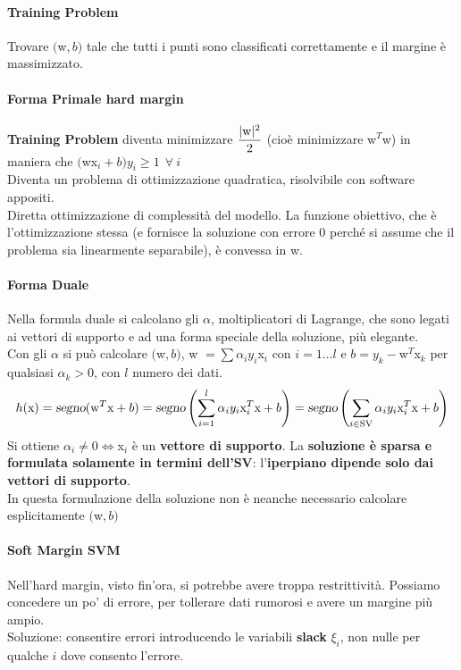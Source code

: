 \documentclass[10pt]{book}
\begin{document}
\paragraph{Training Problem} Trovare $($w$, b)$ tale che tutti i punti sono classificati correttamente e il margine è massimizzato.
\paragraph{Forma Primale hard margin} \textbf{Training Problem} diventa minimizzare $\mathlarger{\frac{|\text{w}|^2}{2}}$ (cioè minimizzare w$^T$w) in maniera che $($wx$_i + b)y_i \geq 1\:\:\forall\:i$\\
Diventa un problema di ottimizzazione quadratica, risolvibile con software appositi.\\
Diretta ottimizzazione di complessità del modello. La funzione obiettivo, che è l'ottimizzazione stessa (e fornisce la soluzione con errore 0 perché si assume che il problema sia linearmente separabile), è convessa in w.
\paragraph{Forma Duale} Nella formula duale si calcolano gli $\alpha$, moltiplicatori di Lagrange, che sono legati ai vettori di supporto e ad una forma speciale della soluzione, più elegante.\\
Con gli $\alpha$ si può calcolare $($w$, b)$, w $= \sum \alpha_i y_i$x$_i$ con $i=1\ldots l$ e $b = y_k - $w$^T$x$_k$ per qualsiasi $\alpha_k > 0$, con $l$ numero dei dati.
$$h(\text{x}) = \textsl{segno}(\text{w}^T\text{x} + b) = \textsl{segno}\left(\sum_{i=1}^l \alpha_i y_i \text{x}_i^T\text{x} + b \right) = \textsl{segno}\left(\sum_{i\in \text{SV}} \alpha_i y_i \text{x}_i^T\text{x} + b \right)$$
Si ottiene $\alpha_i \neq 0 \Leftrightarrow $x$_i$ è un \textbf{vettore di supporto}. La \textbf{soluzione è sparsa e formulata solamente in termini dell'SV}: l'\textbf{iperpiano dipende solo dai vettori di supporto}.\\
In questa formulazione della soluzione non è neanche necessario calcolare esplicitamente $($w$, b)$
\paragraph{Soft Margin SVM} Nell'hard margin, visto fin'ora, si potrebbe avere troppa restrittività. Possiamo concedere un po' di errore, per tollerare dati rumorosi e avere un margine più ampio.\\
Soluzione: consentire errori introducendo le variabili \textbf{slack} $\xi_i$, non nulle per qualche $i$ dove consento l'errore.
\end{document}
